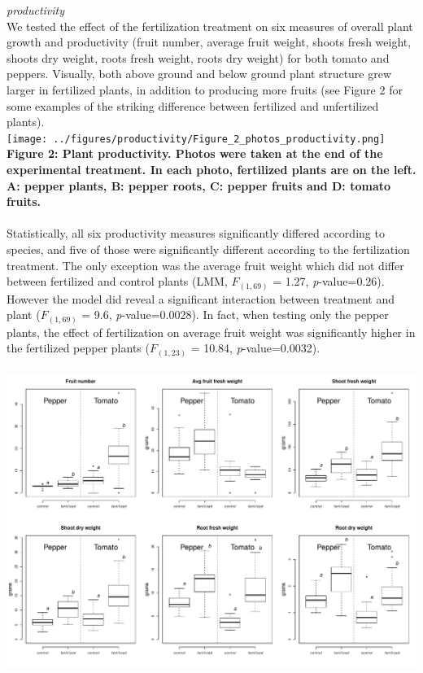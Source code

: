 \documentclass[11pt,]{article}
\begin{document}
\emph{productivity}\\
We tested the effect of the fertilization treatment on six measures of
overall plant growth and productivity (fruit number, average fruit
weight, shoots fresh weight, shoots dry weight, roots fresh weight,
roots dry weight) for both tomato and peppers. Visually, both above
ground and below ground plant structure grew larger in fertilized
plants, in addition to producing more fruits (see Figure 2 for some
examples of the striking difference between fertilized and unfertilized
plants). ~\\
\texttt{[image: ../figures/productivity/Figure\_2\_photos\_productivity.png]}\\
\textbf{Figure 2: Plant productivity. Photos were taken at the end of
the experimental treatment. In each photo, fertilized plants are on the
left. A: pepper plants, B: pepper roots, C: pepper fruits and D: tomato
fruits.}\\
\hspace*{0.333em}\\
Statistically, all six productivity measures significantly differed
according to species, and five of those were significantly different
according to the fertilization treatment. The only exception was the
average fruit weight which did not differ between fertilized and control
plants (LMM, \(F_{(1,69)}\) = 1.27, \emph{p}-value=0.26). However the
model did reveal a significant interaction between treatment and plant
(\(F_{(1,69)}\) = 9.6, \emph{p}-value=0.0028). In fact, when testing
only the pepper plants, the effect of fertilization on average fruit
weight was significantly higher in the fertilized pepper plants
(\(F_{(1,23)}\) = 10.84, \emph{p}-value=0.0032).\\
\hspace*{0.333em}\\
\includegraphics[width=6.25000in]{../figures/productivity/Figure_3_productivity.pdf}\\
\end{document}
